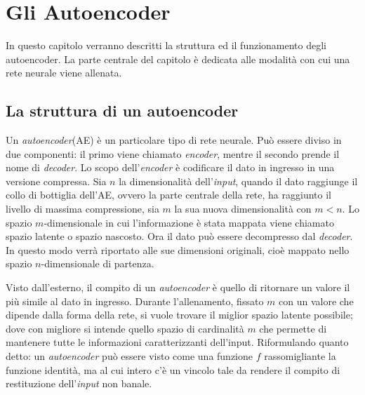 
\chapter{Gli Autoencoder}
In questo capitolo verranno descritti la struttura ed il funzionamento degli autoencoder.
La parte centrale del capitolo è dedicata alle modalità con cui una rete neurale viene allenata.

\section{La struttura di un autoencoder}
Un \textit{autoencoder}(AE) è un particolare tipo di rete neurale.
Può essere diviso in due componenti: il primo viene chiamato \textit{encoder}, mentre il secondo prende il nome di \textit{decoder}.
Lo scopo dell'\textit{encoder} è codificare il dato in ingresso in una versione compressa.
Sia $n$ la dimensionalità dell'\textit{input}, quando il dato raggiunge il collo di bottiglia dell'AE, ovvero la parte centrale della rete, ha raggiunto il livello di massima compressione, sia $m$ la sua nuova dimensionalità con $m<n$.
Lo spazio $m$-dimensionale in cui l'informazione è stata mappata viene chiamato spazio latente o spazio nascosto.
Ora il dato può essere decompresso dal \textit{decoder}.
In questo modo verrà riportato alle sue dimensioni originali, cioè mappato nello spazio $n$-dimensionale di partenza.

Visto dall'esterno, il compito di un \textit{autoencoder} è quello di ritornare un valore il più simile al dato in ingresso.
Durante l'allenamento, fissato $m$ con un valore che dipende dalla forma della rete, si vuole trovare il miglior spazio latente possibile; dove con migliore si intende quello spazio di cardinalità $m$ che permette di mantenere tutte le informazioni caratterizzanti dell'input.
Riformulando quanto detto: un \textit{autoencoder} può essere visto come una funzione $f$ rassomigliante la funzione identità, ma al cui intero c'è un vincolo tale da rendere il compito di restituzione dell'\textit{input} non banale.


